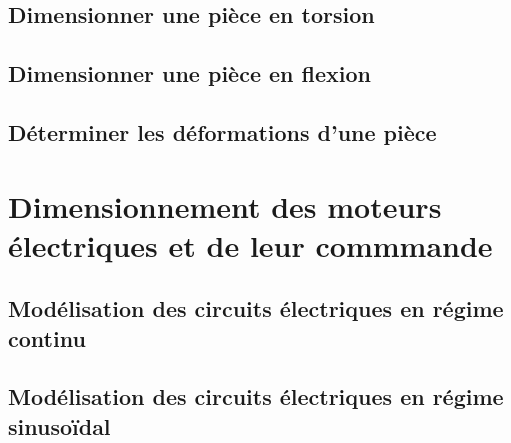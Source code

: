 \section{Dimensionner une pièce en torsion} 
\clearpage 
\newpage 
\section{Dimensionner une pièce en flexion} 
\clearpage 
\newpage 
\section{Déterminer les déformations d'une pièce} 
\graphicspath{{\repStyle/png/}{../RDM/RDM-05-Deformation/531_RdM/images/}} 
 
 
\graphicspath{{\repStyle/png/}{../RDM/RDM-05-Deformation/532_RdM/images/}} 
 
 
\clearpage 
\newpage 
\setchapterpreamble[u]{\margintoc} 
\chapter{Dimensionnement des moteurs électriques et de leur commmande} 
\section{Modélisation des circuits électriques en régime continu} 
\graphicspath{{\repStyle/png/}{../ELEC/ELEC-01/534_CircuitElec/images/}} 
 
 
\graphicspath{{\repStyle/png/}{../ELEC/ELEC-01/535_CircuitElec/images/}} 
 
 
\graphicspath{{\repStyle/png/}{../ELEC/ELEC-01/536_CircuitElec/images/}} 
 
 
\graphicspath{{\repStyle/png/}{../ELEC/ELEC-01/537_CircuitElec/images/}} 
 
 
\graphicspath{{\repStyle/png/}{../ELEC/ELEC-01/538_CircuitElec/images/}} 
 
 
\clearpage 
\newpage 
\section{Modélisation des circuits électriques en régime sinusoïdal} 
\clearpage 
\newpage 
